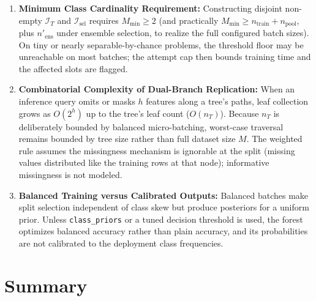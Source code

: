 \documentclass[11pt,a4paper]{article}
\newcommand{\code}[1]{\texttt{#1}}
\begin{document}
\begin{enumerate}[leftmargin=*, itemsep=4pt]
  \item \textbf{Minimum Class Cardinality Requirement:}
  Constructing disjoint non-empty $\mathcal{I}_T$ and $\mathcal{I}_{\text{sel}}$ requires $M_{\min} \ge 2$ (and practically $M_{\min} \ge n_{\text{train}} + n_{\text{pool}}$, plus $n'_{\text{ens}}$ under ensemble selection, to realize the full configured batch sizes). On tiny or nearly separable-by-chance problems, the threshold floor may be unreachable on most batches; the attempt cap then bounds training time and the affected slots are flagged.

  \item \textbf{Combinatorial Complexity of Dual-Branch Replication:}
  When an inference query omits or masks $h$ features along a tree's paths, leaf collection grows as $O(2^h)$ up to the tree's leaf count ($O(n_T)$). Because $n_T$ is deliberately bounded by balanced micro-batching, worst-case traversal remains bounded by tree size rather than full dataset size $M$. The weighted rule assumes the missingness mechanism is ignorable at the split (missing values distributed like the training rows at that node); informative missingness is not modeled.

  \item \textbf{Balanced Training versus Calibrated Outputs:}
  Balanced batches make split selection independent of class skew but produce posteriors for a uniform prior. Unless \code{class\_priors} or a tuned decision threshold is used, the forest optimizes balanced accuracy rather than plain accuracy, and its probabilities are not calibrated to the deployment class frequencies.
\end{enumerate}

\section{Summary}
\end{document}
